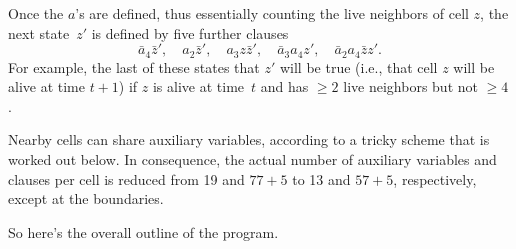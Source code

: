 Once the $a$'s are defined, thus essentially counting the
live neighbors of cell $z$, the next
state~$z'$ is defined by five further clauses
$$\bar a_4\bar z',\quad
a_2\bar z',\quad
a_3z\bar z',\quad
\bar a_3a_4z',\quad
\bar a_2a_4\bar zz'.$$
For example, the last of these states that $z'$ will be true
(i.e., that cell $z$ will be alive at time $t+1$) if
$z$ is alive at time~$t$ and has $\ge2$ live neighbors
but not $\ge4$.

Nearby cells can share auxiliary variables, according to a tricky scheme that
is worked out below. In consequence, the actual number of auxiliary variables
and clauses per cell is reduced from 19 and $77+5$ to 13 and $57+5$,
respectively, except at the boundaries.

\fi

So here's the overall outline of the program.

